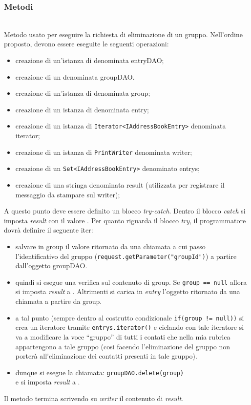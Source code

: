 \subsubsection*{Metodi}
\begin{description}
	\item{}\\	
	Metodo usato per eseguire la richiesta di eliminazione di un gruppo. Nell'ordine proposto, devono essere eseguite le seguenti operazioni:
	\begin{itemize}
		\item creazione di un'istanza di  denominata entryDAO;
		\item creazione di un  denominata groupDAO.
		\item creazione di un'istanza di  denominata group;
		\item creazione di un istanza di  denominata entry;
		\item creazione di un istanza di \texttt{Iterator<IAddressBookEntry>} denominata iterator;
		\item creazione di un istanza di \texttt{PrintWriter} denominata writer;
		\item creazione di un \texttt{Set<IAddressBookEntry>} denominato entrys;
		\item creazione di una stringa denominata result (utilizzata per registrare il messaggio da stampare sul writer);
	\end{itemize} 
	A questo punto deve essere definito un blocco \textit{try-catch}. Dentro il blocco \textit{catch} si  imposta \textit{result} con il valore . Per quanto riguarda il blocco \textit{try}, il programmatore dovrà definire il seguente iter:
	\begin{itemize}
		\item salvare in group il valore ritornato da una chiamata  a cui passo l'identificativo del gruppo (\texttt{request.getParameter("groupId")}) a partire dall'oggetto groupDAO.
		\item quindi si esegue una verifica sul contenuto di group. Se \texttt{group == null} allora si imposta \textit{result} a . Altrimenti si carica in \textit{entry} l'oggetto ritornato da una chiamata  a partire da group.
		\item a tal punto (sempre dentro al costrutto condizionale \texttt{if(group != null))} si crea un iteratore tramite \texttt{entrys.iterator()} e ciclando con tale iteratore si va a modificare la voce ``gruppo'' di tutti i contati che nella mia rubrica appartengono a tale gruppo (cosi facendo l'eliminazione del gruppo non porterà all'eliminazione dei contatti presenti in tale gruppo).
		\item dunque si esegue la chiamata:
		\verb|groupDAO.delete(group)|\\
		e si imposta \textit{result} a .
	\end{itemize}
	Il metodo termina scrivendo su \textit{writer} il contenuto di \textit{result}.
	

\end{description}
